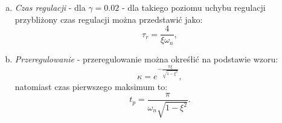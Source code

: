 \documentclass{article}
\begin{document}
    \begin{enumerate}[(a)]
        \item \textit{Czas regulacji} - dla $\gamma = 0.02$ - dla takiego poziomu uchybu regulacji przybliżony czas regulacji można przedstawić jako:
        $$
            \tau_{r} = \frac{4}{\xi\omega_{n}},
        $$
        \item \textit{Przeregulowanie} - przeregulowanie można okreśłić na podstawie wzoru:
        $$
            \kappa = e^{-\frac{\pi\xi}{\sqrt{1-\xi^2}}},
        $$
        natomiast czas pierwszego maksimum to:
        $$
            t_{p} = \frac{\pi}{\omega_{n}\sqrt{1-\xi^2}}.
        $$
    \end{enumerate}
    
\end{document}
